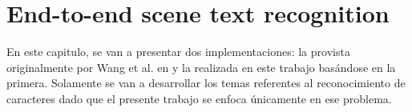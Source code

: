 \newpage	
\section{End-to-end scene text recognition}

	En este capitulo, se van a presentar dos implementaciones: la provista originalmente por Wang et al. en \cite{wang} y la realizada en este trabajo basándose en la primera. Solamente se van a desarrollar los temas referentes al reconocimiento de caracteres dado que el presente trabajo se enfoca únicamente en ese problema.
	
		
	
	
	
	
	
